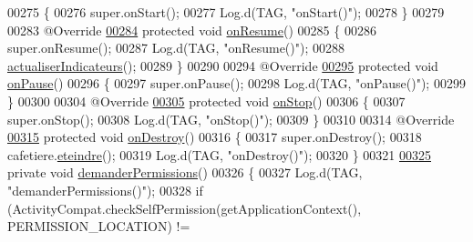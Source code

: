\begin{DoxyCode}
00275     \{
00276         super.onStart();
00277         Log.d(TAG, \textcolor{stringliteral}{"onStart()"});
00278     \}
00279 
00283     @Override
\hyperlink{classcom_1_1example_1_1ekawa_1_1_ihm_aec9b38c2990ae4bdee8df0b49253120f}{00284}     \textcolor{keyword}{protected} \textcolor{keywordtype}{void} \hyperlink{classcom_1_1example_1_1ekawa_1_1_ihm_aec9b38c2990ae4bdee8df0b49253120f}{onResume}()
00285     \{
00286         super.onResume();
00287         Log.d(TAG, \textcolor{stringliteral}{"onResume()"});
00288         \hyperlink{classcom_1_1example_1_1ekawa_1_1_ihm_a2c3740dd5be20b3111b36649514fd41e}{actualiserIndicateurs}();
00289     \}
00290 
00294     @Override
\hyperlink{classcom_1_1example_1_1ekawa_1_1_ihm_a4cf2ee6861e571d2634a4dd2492e9be9}{00295}     \textcolor{keyword}{protected} \textcolor{keywordtype}{void} \hyperlink{classcom_1_1example_1_1ekawa_1_1_ihm_a4cf2ee6861e571d2634a4dd2492e9be9}{onPause}()
00296     \{
00297         super.onPause();
00298         Log.d(TAG, \textcolor{stringliteral}{"onPause()"});
00299     \}
00300 
00304     @Override
\hyperlink{classcom_1_1example_1_1ekawa_1_1_ihm_adc7bc6671d8cd5018724bcbf4fbc0d75}{00305}     \textcolor{keyword}{protected} \textcolor{keywordtype}{void} \hyperlink{classcom_1_1example_1_1ekawa_1_1_ihm_adc7bc6671d8cd5018724bcbf4fbc0d75}{onStop}()
00306     \{
00307         super.onStop();
00308         Log.d(TAG, \textcolor{stringliteral}{"onStop()"});
00309     \}
00310 
00314     @Override
\hyperlink{classcom_1_1example_1_1ekawa_1_1_ihm_a5ae27969ec39afede5d0cd36b469f145}{00315}     \textcolor{keyword}{protected} \textcolor{keywordtype}{void} \hyperlink{classcom_1_1example_1_1ekawa_1_1_ihm_a5ae27969ec39afede5d0cd36b469f145}{onDestroy}()
00316     \{
00317         super.onDestroy();
00318         cafetiere.\hyperlink{classcom_1_1example_1_1ekawa_1_1_cafetiere_acca6b757d8fad0d0faf64f3266557ca2}{eteindre}();
00319         Log.d(TAG, \textcolor{stringliteral}{"onDestroy()"});
00320     \}
00321 
\hyperlink{classcom_1_1example_1_1ekawa_1_1_ihm_a30e0dc3bf57b1abc608cb8b932527566}{00325}     \textcolor{keyword}{private} \textcolor{keywordtype}{void} \hyperlink{classcom_1_1example_1_1ekawa_1_1_ihm_a30e0dc3bf57b1abc608cb8b932527566}{demanderPermissions}()
00326     \{
00327         Log.d(TAG, \textcolor{stringliteral}{"demanderPermissions()"});
00328         \textcolor{keywordflow}{if} (ActivityCompat.checkSelfPermission(getApplicationContext(), PERMISSION\_LOCATION) != 

\end{DoxyCode}
